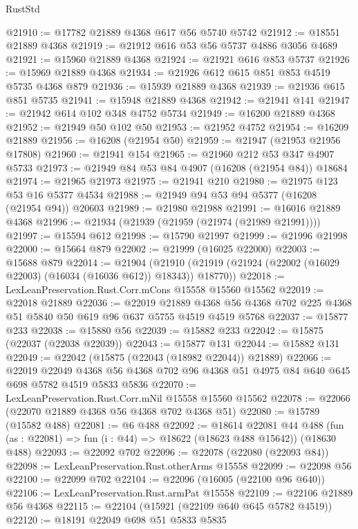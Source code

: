 \begin{lexlean}{RustStd}
\begin{coremodule}
@21910 := @17782 @21889 @4368 @617 @56 @5740 @5742
@21912 := @18551 @21889 @4368
@21919 := @21912 @616 @53 @56 @5737 @4886 @3056 @4689
@21921 := @15960 @21889 @4368
@21924 := @21921 @616 @853 @5737
@21926 := @15969 @21889 @4368
@21934 := @21926 @612 @615 @851 @853 @4519 @5735 @4368 @879
@21936 := @15939 @21889 @4368
@21939 := @21936 @615 @851 @5735
@21941 := @15948 @21889 @4368
@21942 := @21941 @141
@21947 := @21942 @614 @102 @348 @4752 @5734
@21949 := @16200 @21889 @4368
@21952 := @21949 @50 @102 @50
@21953 := @21952 @4752
@21954 := @16209 @21889
@21956 := @16208 (@21954 @50)
@21959 := @21947 (@21953 @21956 @17808)
@21960 := @21941 @154
@21965 := @21960 @212 @53 @347 @4907 @5733
@21973 := @21949 @84 @53 @84 @4907 (@16208 (@21954 @84)) @18684
@21974 := @21965 @21973
@21975 := @21941 @210
@21980 := @21975 @123 @53 @16 @5377 @4534
@21988 := @21949 @94 @53 @94 @5377 (@16208 (@21954 @94)) @20603
@21989 := @21980 @21988
@21991 := @16016 @21889 @4368
@21996 := @21934 (@21939 (@21959 (@21974 (@21989 @21991))))
@21997 := @15594 @612
@21998 := @15790 @21997
@21999 := @21996 @21998
@22000 := @15664 @879
@22002 := @21999 (@16025 @22000)
@22003 := @15688 @879
@22014 := @21904
    (@21910 (@21919 (@21924 (@22002 (@16029 @22003) (@16034 (@16036 @612)) @18343)) @18770))
@22018 := LexLeanPreservation.Rust.Corr.mCons @15558 @15560 @15562
@22019 := @22018 @21889
@22036 := @22019
    @21889
    @4368
    @56
    @4368
    @702
    @225
    @4368
    @51
    @5840
    @50
    @619
    @96
    @637
    @5755
    @4519
    @4519
    @5768
@22037 := @15877 @233
@22038 := @15880 @56
@22039 := @15882 @233
@22042 := @15875 (@22037 (@22038 @22039))
@22043 := @15877 @131
@22044 := @15882 @131
@22049 := @22042 (@15875 (@22043 (@18982 @22044)) @21889)
@22066 := @22019
    @22049
    @4368
    @56
    @4368
    @702
    @96
    @4368
    @51
    @4975
    @84
    @640
    @645
    @698
    @5782
    @4519
    @5833
    @5836
@22070 := LexLeanPreservation.Rust.Corr.mNil @15558 @15560 @15562
@22078 := @22066 (@22070 @21889 @4368 @56 @4368 @702 @4368 @51)
@22080 := @15789 (@15582 @488)
@22081 := @6 @488
@22092 := @18614
    @22081
    @44
    @488
    (fun (as : @22081) => fun (i : @44) => @18622 (@18623 @488 @15642))
    (@18630 @488)
@22093 := @22092 @702
@22096 := @22078 (@22080 (@22093 @84))
@22098 := LexLeanPreservation.Rust.otherArms @15558
@22099 := @22098 @56
@22100 := @22099 @702
@22104 := @22096 (@16005 (@22100 @96 @640))
@22106 := LexLeanPreservation.Rust.armPat @15558
@22109 := @22106 @21889 @56 @4368
@22115 := @22104 (@15921 (@22109 @640 @645 @5782 @4519))
@22120 := @18191 @22049 @698 @51 @5833 @5835

\end{coremodule}
\end{lexlean}
